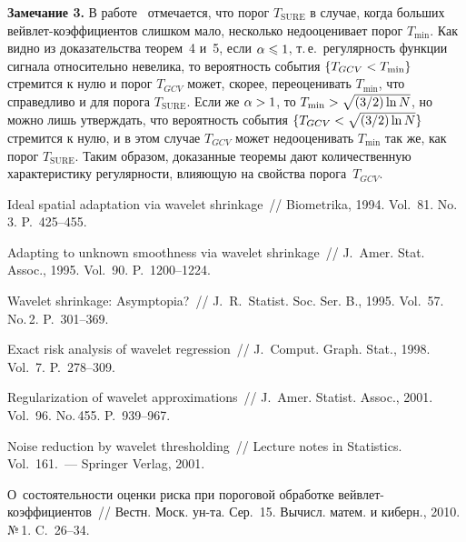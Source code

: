 \begin{multicols}{2}
\noindent
\textbf{Замечание 3.} В работе~\cite{1-she} отмечается, что порог $T_{\mathrm{SURE}}$ 
в случае, когда больших вейв\-лет-ко\-эф\-фи\-ци\-ен\-тов 
слишком мало, несколько недооценивает порог $T_{\min}$. Как видно из доказательства теорем~4 и~5, если 
$\alpha\hm\leqslant1$, т.\,е.\ регулярность функции сигнала относительно невелика, то вероятность события $\{T_{GCV}\hm<T_{\min}\}$
 стремится к нулю и порог $T_{GCV}$ может, скорее, переоценивать $T_{\min}$, что справедливо и для порога $T_{\mathrm{SURE}}$. 
 Если же $\alpha\hm>1$, то $T_{\min}\hm>\sqrt{(3/2)\ln N}$, но можно лишь утверждать, что вероятность события 
 $\{T_{GCV}\hm<\sqrt{(3/2)\ln N}\}$ стремится к нулю, и в этом случае $T_{GCV}$ может недооценивать $T_{\min}$ 
 так же, как порог $T_{\mathrm{SURE}}$. Таким образом, доказанные теоремы дают количественную характеристику регулярности, 
 влияющую на свойства порога~$T_{GCV}$.
 
 {\small\frenchspacing
{%
\begin{thebibliography}{99}


 Ideal spatial adaptation via wavelet shrinkage~// Biometrika, 1994. Vol.~81. No.\,3. P.~425--455.

 Adapting to unknown smoothness via wavelet shrinkage~// J.~Amer. Stat. Assoc., 1995. Vol.~90. P.~1200--1224.

 Wavelet shrinkage: Asymptopia?~// J.~R.~Statist. Soc. Ser. B., 1995. 
Vol.~57. No.\,2. P.~301--369.

 Exact risk analysis of wavelet regression~// 
J.~Comput. Graph. Stat., 1998. Vol.~7. P.~278--309.

 Regularization of wavelet approximations~// 
J.~Amer. Statist. Assoc., 2001. Vol.~96. No.\,455. P.~939--967.

 Noise reduction by wavelet thresholding~//
Lecture notes in Statistics. Vol.~161.~--- Springer Verlag, 2001.

 О~со\-сто\-я\-тель\-ности оценки риска при пороговой обработке вейв\-лет-ко\-эф\-фи\-ци\-ен\-тов~// 
Вестн. Моск. ун-та. Сер.~15. Вычисл. матем. и киберн., 2010. №\,1. C.~26--34.


\end{thebibliography}}}
\end{multicols}
